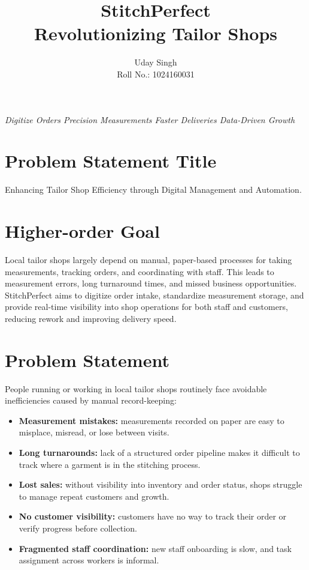 \documentclass[11pt]{article}
\title{\textbf{StitchPerfect}\\[4pt]\large Revolutionizing Tailor Shops}
\author{Uday Singh \\ Roll No.: 1024160031}
\date{}
\begin{document}
\maketitle
\vspace{-1em}
\begin{center}
\textit{Digitize Orders \quad Precision Measurements \quad Faster Deliveries \quad Data-Driven Growth}
\end{center}

\section*{Problem Statement Title}
Enhancing Tailor Shop Efficiency through Digital Management and Automation.

\section{Higher-order Goal}
Local tailor shops largely depend on manual, paper-based processes for taking measurements,
tracking orders, and coordinating with staff. This leads to measurement errors, long turnaround
times, and missed business opportunities. StitchPerfect aims to digitize order intake, standardize
measurement storage, and provide real-time visibility into shop operations for both staff and
customers, reducing rework and improving delivery speed.

\section{Problem Statement}
People running or working in local tailor shops routinely face avoidable inefficiencies caused by
manual record-keeping:

\begin{itemize}[leftmargin=1.5em]
  \item \textbf{Measurement mistakes:} measurements recorded on paper are easy to misplace, misread, or lose between visits.
  \item \textbf{Long turnarounds:} lack of a structured order pipeline makes it difficult to track where a garment is in the stitching process.
  \item \textbf{Lost sales:} without visibility into inventory and order status, shops struggle to manage repeat customers and growth.
  \item \textbf{No customer visibility:} customers have no way to track their order or verify progress before collection.
  \item \textbf{Fragmented staff coordination:} new staff onboarding is slow, and task assignment across workers is informal.
\end{itemize}
\end{document}
